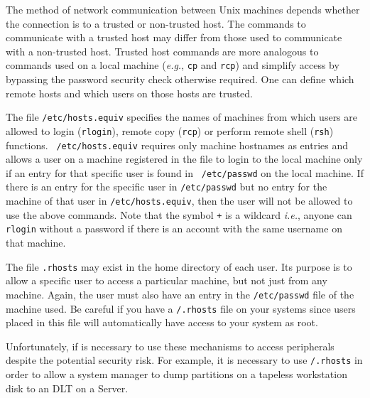 The method of network communication between Unix machines depends
whether the connection is to a trusted or non-trusted host. The
commands to communicate with a trusted host may differ from those used
to communicate with a non-trusted host. Trusted host commands are more
analogous to commands used on a local machine (\emph{e.g.}, {\tt cp} and
{\tt rcp}) and simplify access by bypassing the password security check
otherwise required.  One can define which remote hosts and which users
on those hosts are trusted.

The file {\tt /etc/hosts.equiv} specifies the names of machines from
which users are allowed to login (\verb+rlogin+), remote copy
(\verb+rcp+) or perform remote shell (\verb+rsh+) functions. {\tt
/etc/hosts.equiv} requires only machine hostnames as entries and allows
a user on a machine registered in the file to login to the local
machine only if an entry for that specific user is found in {\tt
/etc/passwd} on the local machine. If there is an entry for the
specific user in {\tt /etc/passwd} but no entry for the machine of that
user in {\tt /etc/hosts.equiv}, then the user will not be allowed to
use the above commands.  Note that the symbol {\tt +} is a wildcard
\emph{i.e.}, anyone can {\tt rlogin} without a password if there is an
account with the same username on that machine.

The file {\tt .rhosts} may exist in the home directory
of each user. Its purpose is to allow a specific user to access a
particular machine, but not just from any machine. Again, the user must
also have an entry in the {\tt /etc/passwd} file of the machine used.
Be careful if you have a {\tt /.rhosts} file on your systems since users
placed in this file will automatically have access to your system as
root.

Unfortunately, if is necessary to use these mechanisms to access
peripherals despite the potential security risk. For example, it is
necessary to use {\tt /.rhosts} in order to allow a system manager to
dump partitions on a tapeless workstation disk to an DLT on a Server.


